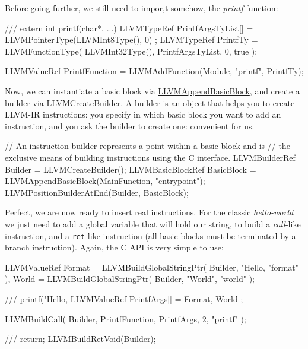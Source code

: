 \documentclass[a4paper, 11pt, notitlepage]{report}
\begin{document}
Before going further, we still need to impor,t somehow, the \textit{printf} function:

\begin{ccode}
/// extern int printf(char*, ...)
LLVMTypeRef PrintfArgsTyList[] = { LLVMPointerType(LLVMInt8Type(), 0) };
LLVMTypeRef PrintfTy = LLVMFunctionType(
    LLVMInt32Type(),
    PrintfArgsTyList,
    0,
    true
);

LLVMValueRef PrintfFunction = LLVMAddFunction(Module, "printf", PrintfTy);
\end{ccode}

Now, we can instantiate a basic block via \href{https://llvm.org/viewvc/llvm-project/llvm/trunk/include/llvm-c/Core.h?view=markup}{LLVMAppendBasicBlock}, and create a builder via \href{https://llvm.org/viewvc/llvm-project/llvm/trunk/include/llvm-c/Core.h?view=markup}{LLVMCreateBuilder}. A builder is an object that helps you to create LLVM-IR instructions: you specify in which basic block you want to add an instruction, and you ask the builder to create one: convenient for us.
\begin{ccode}
// An instruction builder represents a point within a basic block and is
// the exclusive means of building instructions using the C interface.
LLVMBuilderRef Builder = LLVMCreateBuilder();
LLVMBasicBlockRef BasicBlock = LLVMAppendBasicBlock(MainFunction, "entrypoint");
LLVMPositionBuilderAtEnd(Builder, BasicBlock);
\end{ccode}

Perfect, we are now ready to insert real instructions. For the classic \textit{hello-world} we just need to add a global variable that will hold our string, to build a \textit{call}-like instruction, and a \texttt{ret}-like instruction (all basic blocks must be terminated by a branch instruction). Again, the C API is very simple to use:
\begin{ccode}
LLVMValueRef Format = LLVMBuildGlobalStringPtr(
    Builder,
    "Hello, %
    "format"
), World = LLVMBuildGlobalStringPtr(
    Builder,
    "World",
    "world"
);

/// printf("Hello, %
LLVMValueRef PrintfArgs[] = { Format, World };

LLVMBuildCall(
    Builder,
    PrintfFunction,
    PrintfArgs,
    2,
    "printf"
);

/// return;
LLVMBuildRetVoid(Builder);
\end{ccode}
\end{document}
